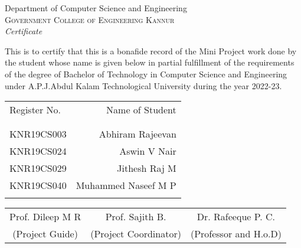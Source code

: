 \newpage
\thispagestyle{empty}

\begin{center}

\huge{Department of Computer Science and Engineering}\\[0.5cm]
\normalsize
\textsc{Government College of Engineering Kannur}\\[2.0cm]

\emph{\LARGE Certificate}\\[1.0cm]
\end{center}

\normalsize This is to certify that this is a bonafide record of the Mini Project work 
done by the student whose name is given below in partial fulfillment of the requirements of the 
degree of Bachelor of Technology in Computer Science and Engineering under A.P.J.Abdul Kalam Technological 
University during the year 2022-23.\\[1.0cm]

\begin{table}[h]
\centering
\begin{tabular}{lr}
Register No. & Name of Student \\ \\ \hline
\\
KNR19CS003  & Abhiram Rajeevan \\  
KNR19CS024  & Aswin V Nair \\ 
KNR19CS029  & Jithesh Raj M  \\ 
KNR19CS040  & Muhammed Naseef M P \\ \\
\end{tabular}
\end{table}


\begin{table}[h]
\centering
\begin{tabular}{ccc}
Prof. Dileep M R & Prof. Sajith B. & Dr. Rafeeque P. C.\\
 (Project Guide) & (Project Coordinator) & (Professor and H.o.D)\\
\end{tabular}
\end{table}






